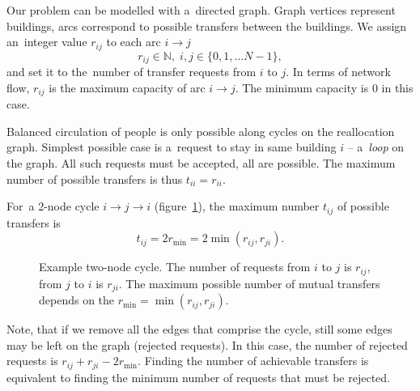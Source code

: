 \documentclass[paper=a4,parskip=half,DIV=12]{leetcode}
\begin{document}
Our problem can be modelled with a~directed graph. Graph vertices represent
buildings, arcs correspond to possible transfers between the buildings. We
assign an~integer value $r_{ij}$ to each arc $i \to j$
\begin{equation}
    r_{ij} \in \mathbb{N}, \; i, j \in \{ 0, 1, \dots N-1 \},
    \label{eq:49EZ8}
\end{equation}
and set it to the~number of transfer requests from $i$ to $j$. In terms of
network flow, $r_{ij}$ is the maximum capacity of arc $i \to j$. The minimum
capacity is $0$ in this case.

Balanced circulation of people is only possible along cycles on the
reallocation graph. Simplest possible case is a~request to stay in same
building $i$ -- a~{\em loop} on the graph. All such requests must be accepted,
all are possible. The maximum number of possible transfers is thus $t_{ii} = r_{ii}$.

For~a 2-node cycle $i \to j \to i$ (figure~\ref{fig:DRV1T}), the maximum number
$t_{ij}$ of possible transfers is
\begin{equation}
  t_{ij} = 2 r_{\min} = 2 \min{(r_{ij}, r_{ji})}.
  \label{eq:FMMLO}
\end{equation}
\begin{figure}[htbp]
  \centering
  \caption{Example two-node cycle. The number of requests from $i$ to $j$ is
  $r_{ij}$, from $j$ to $i$ is $r_{ji}$. The maximum possible number of mutual
  transfers depends on the $r_{\min} = \min{(r_{ij}, r_{ji})}$.}
  \label{fig:DRV1T}
\end{figure}
Note, that if we remove all the edges that comprise the cycle, still some edges
may be left on the graph (rejected requests). In this case, the number of
rejected requests is $r_{ij} + r_{ji} - 2 r_{\min}$. Finding the number of
achievable transfers is equivalent to finding the minimum number of requests
that must be rejected.
\end{document}
